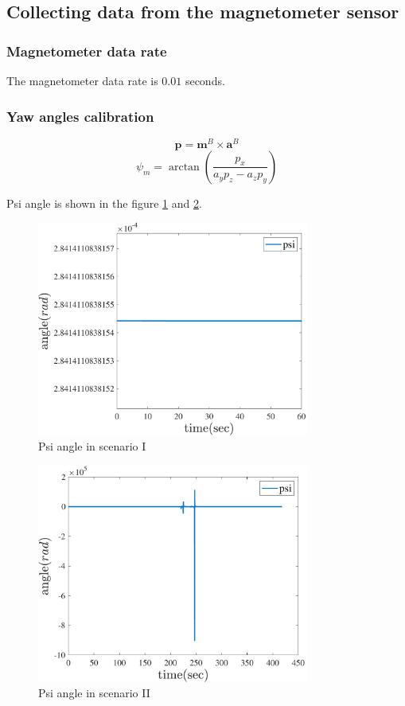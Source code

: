 \subsection{Collecting data from the magnetometer sensor}
\subsubsection{Magnetometer data rate}
The magnetometer data rate is $0.01$ seconds.
\subsubsection{Yaw angles calibration}
\begin{equation}
  \bm{p} = \bm{m}^B \times \bm{a}^B
\end{equation}
\begin{equation}
  \psi_m = \arctan{\left(\dfrac{p_x}{a_y p_z - a_z p_y}\right)}
\end{equation}

Psi angle is shown in the figure \ref{fig:psi_angle} and \ref{fig:psi_angle_2}.
\begin{figure}[H]
  \centering
  \includegraphics[width=0.8\textwidth]{../Figure/Q1/psi}
  \caption{Psi angle in scenario I}
  \label{fig:psi_angle}
\end{figure}

\begin{figure}[H]
  \centering
  \includegraphics[width=0.8\textwidth]{../Figure/Q1/psi_2}
  \caption{Psi angle in scenario II}
  \label{fig:psi_angle_2}
\end{figure}

